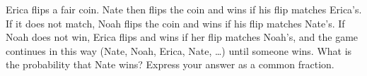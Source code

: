 Erica flips a fair coin. Nate then flips the coin and wins if his flip matches Erica's. If it does not match, Noah flips the coin and wins if his flip matches Nate's. If Noah does not win, Erica flips and wins if her flip matches Noah's, and the game continues in this way (Nate, Noah, Erica, Nate, \dots) until someone wins. What is the probability that Nate wins? Express your answer as a common fraction.
